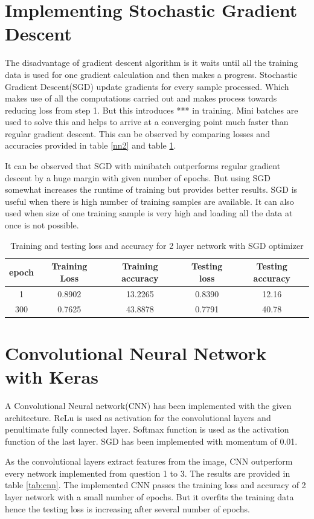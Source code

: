 \documentclass[a4paper, 12pt]{article}
\begin{document}
	\section{Implementing Stochastic Gradient Descent}
		The disadvantage of gradient descent algorithm is it waits until all the training data is used for one gradient calculation and then makes a progress. Stochastic Gradient Descent(SGD) update gradients for every sample processed. Which makes use of all the computations carried out and makes process towards reducing loss from step 1. But this introduces *** in training. Mini batches are used to solve this and helps to arrive at a converging point much faster than regular gradient descent. This can be observed by comparing losses and accuracies provided in table \ref{nn2} and table \ref{sgd}. 
		\par 
		It can be observed that SGD with minibatch outperforms regular gradient descent by a huge margin with given number of epochs. But using SGD somewhat increases the runtime of training but provides better results. SGD is useful when there is high number of training samples are available. It can also used when size of one training sample is very high and loading all the data at once is not possible.
		\begin{table}
			\centering
			\begin{tabular}{|c|c|c|c|c|}
				\hline
				epoch & Training Loss & Training accuracy & Testing loss & Testing accuracy\\
				\hline
				1 & 0.8902 & 13.2265 & 0.8390 & 12.16 \\
				300 & 0.7625 & 43.8878 & 0.7791 & 40.78\\
				\hline
				
			\end{tabular}
			
			\caption{Training and testing loss and accuracy for 2 layer network with SGD optimizer}
			\label{sgd}
		\end{table}
	
	\section{Convolutional Neural Network with Keras}
		A Convolutional Neural network(CNN) has been implemented with the given architecture. ReLu is used as activation for the convolutional layers and penultimate fully connected layer. Softmax function is used as the activation function of the last layer. SGD has been implemented with momentum of 0.01. 
		\par 
		As the convolutional layers extract features from the image, CNN outperform every network implemented from question 1 to 3. The results are provided in table \ref{tab:cnn}. The implemented CNN passes the training loss and accuracy of 2 layer network with a small number of epochs. But it overfits the training data hence the testing loss is increasing after several number of epochs.
	
\end{document}
